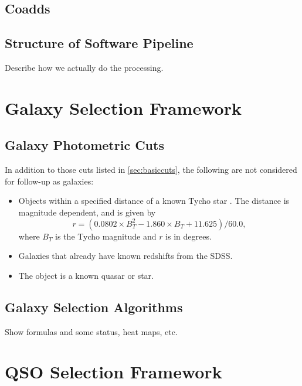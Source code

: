 \documentclass[12pt,preprint]{aastex}
\begin{document}
\subsection{Coadds}

\subsection{Structure of Software Pipeline} \label{sec:structure}

Describe how we actually do the processing.

\section{Galaxy Selection Framework} \label{sec:galframe}

\subsection{Galaxy Photometric Cuts}

In addition to those cuts listed in \ref{sec:basiccuts}, the following are not
considered for follow-up as galaxies:

\begin{itemize}

    \item Objects within a specified distance of a known Tycho star
    \citep{tycho2}.  The distance is magnitude dependent, and is given 
    by
    \begin{equation}
    r = (0.0802\times B_T^2 - 1.860\times B_T + 11.625)/60.0,
    \end{equation}
    where $B_T$ is the Tycho magnitude and $r$ is in degrees.

    \item Galaxies that already have known redshifts from the SDSS.

    \item The object is a known quasar or star.

\end{itemize}

\subsection{Galaxy Selection Algorithms}

Show formulas and some status, heat maps, etc.


\section{QSO Selection Framework} \label{sec:qsoframe}
\end{document}
